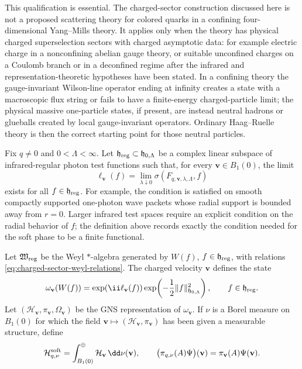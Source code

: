 This qualification is essential.  The charged-sector construction discussed
here is not a proposed scattering theory for colored quarks in a confining
four-dimensional Yang--Mills theory.  It applies only when the theory has
physical charged superselection sectors with charged asymptotic data: for
example electric charge in a nonconfining abelian gauge theory, or suitable
unconfined charges on a Coulomb branch or in a deconfined regime after the
infrared and representation-theoretic hypotheses have been stated.  In a
confining theory the gauge-invariant Wilson-line operator ending at infinity
creates a state with a macroscopic flux string or fails to have a
finite-energy charged-particle limit; the physical massive one-particle
states, if present, are instead neutral hadrons or glueballs created by local
gauge-invariant operators.  Ordinary Haag--Ruelle theory is then the correct
starting point for those neutral particles.

Fix \(q\ne0\) and \(0<\Lambda<\infty\).  Let
\(\mathfrak h_{\rm reg}\subset\mathfrak h_{0,\Lambda}\) be a complex linear
subspace of infrared-regular photon test functions such that, for every
\(\mathbf v\in B_1(0)\), the limit
\begin{equation}
  \ell_{\mathbf v}(f)
  =
  \lim_{\lambda\downarrow0}
  \sigma(F_{q,\mathbf v,\lambda,\Lambda},f)
  \label{eq:velocity-soft-character-limit}
\end{equation}
exists for all \(f\in\mathfrak h_{\rm reg}\).  For example, the condition is
satisfied on smooth compactly supported one-photon wave packets whose radial
support is bounded away from \(r=0\).  Larger infrared test spaces require an
explicit condition on the radial behavior of \(f\); the definition above
records exactly the condition needed for the soft phase to be a finite
functional.

Let \(\mathfrak W_{\rm reg}\) be the Weyl \(*\)-algebra generated by
\(W(f)\), \(f\in\mathfrak h_{\rm reg}\), with relations
\eqref{eq:charged-sector-weyl-relations}.  The charged velocity
\(\mathbf v\) defines the state
\begin{equation}
  \omega_{\mathbf v}(W(f))
  =
  \exp\!\left(\ii\ell_{\mathbf v}(f)\right)
  \exp\!\left(-\frac12\|f\|^2_{\mathfrak h_{0,\Lambda}}\right),
  \qquad f\in\mathfrak h_{\rm reg}.
  \label{eq:velocity-fiber-soft-state}
\end{equation}
Let \((\mathcal H_{\mathbf v},\pi_{\mathbf v},\Omega_{\mathbf v})\) be the
GNS representation of \(\omega_{\mathbf v}\).  If \(\nu\) is a Borel measure
on \(B_1(0)\) for which the field
\(\mathbf v\mapsto(\mathcal H_{\mathbf v},\pi_{\mathbf v})\) has been given a
measurable structure, define
\begin{equation}
  \mathcal H_{q,\nu}^{\rm soft}
  =
  \int_{B_1(0)}^{\oplus}\mathcal H_{\mathbf v}\,\dd\nu(\mathbf v),
  \qquad
  \bigl(\pi_{q,\nu}(A)\Psi\bigr)(\mathbf v)
  =
  \pi_{\mathbf v}(A)\Psi(\mathbf v).
  \label{eq:charged-soft-direct-integral-representation}
\end{equation}

